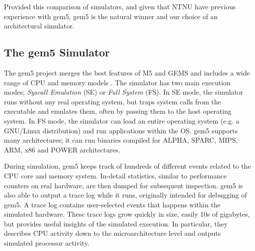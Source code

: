 Provided this comparison of simulators, and given that NTNU have previous
experience with gem5, gem5 is the natural winner and our choice of an
architectural simulator.


\subsection{The gem5 Simulator}

The gem5 project \cite{gem5} merges the best features of M5 \cite{binkert2006m5}
and GEMS \cite{GEMS} and includes a wide range of CPU and memory models
\cite{gem5hipeac}. The simulator has two main execution modes; \textit{Syscall
Emulation} (SE) or \textit{Full System} (FS). In SE mode, the simulator runs
without any real operating system, but traps system calls from the executable
and emulates them, often by passing them to the host operating system. In FS
mode, the simulator can load an entire operating system (e.g. a GNU/Linux
distribution) and run applications within the OS. gem5 supports many
architectures; it can run binaries compiled for ALPHA, SPARC, MIPS, ARM, x86 and
POWER architectures.

During simulation, gem5 keeps track of hundreds of different events related to
the CPU core and memory system. In-detail statistics, similar to performance
counters on real hardware, are then dumped for subsequent inspection. gem5 is
also able to output a trace log while it runs, originally intended for debugging
of gem5. A trace log contains user-selected events that happens within the
simulated hardware. These trace logs grow quickly in size, easily 10s of
gigabytes, but provides useful insights of the simulated execution. In
particular, they describes CPU activity down to the microarchitecture level and
outputs simulated processor activity.

